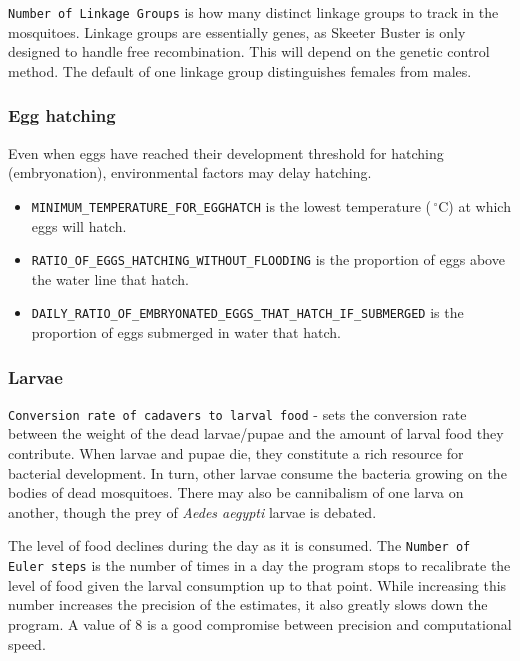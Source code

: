 \documentclass[11pt]{article}
\newcommand{\linecmd}[1]{\texttt{#1}}
\begin{document}
\linecmd{Number of Linkage Groups} is how many distinct linkage groups to track in the mosquitoes. Linkage groups are essentially genes, as Skeeter Buster is only designed to handle free recombination. This will depend on the genetic control method. The default of one linkage group distinguishes females from males.

\subsubsection{Egg hatching}\label{kinetics}
Even when eggs have reached their development threshold for hatching (embryonation), environmental factors may delay hatching.

\begin{itemize}
	\item \linecmd{MINIMUM\_TEMPERATURE\_FOR\_EGGHATCH} is the lowest temperature ($\,^{\circ}\mathrm{C}$) at which eggs will hatch.
	\item \linecmd{RATIO\_OF\_EGGS\_HATCHING\_WITHOUT\_FLOODING} is the proportion of eggs above the water line that hatch.
	\item \linecmd{DAILY\_RATIO\_OF\_EMBRYONATED\_EGGS\_THAT\_HATCH\_IF\_SUBMERGED} is the proportion of eggs submerged in water that hatch.
\end{itemize}

\subsubsection{Larvae}

\linecmd{Conversion rate of cadavers to larval food} - sets the conversion rate between the weight of the dead larvae/pupae and the amount of larval food they contribute. When larvae and pupae die, they constitute a rich resource for bacterial development. In turn, other larvae consume the bacteria growing on the bodies of dead mosquitoes. There may also be cannibalism of one larva on another, though the prey of \emph{Aedes aegypti} larvae is debated.%

The level of food declines during the day as it is consumed. The \linecmd{Number of Euler steps} is the number of times in a day the program stops to recalibrate the level of food given the larval consumption up to that point. While increasing this number increases the precision of the estimates, it also greatly slows down the program. A value of $8$ is a good compromise between precision and computational speed.
\end{document}
